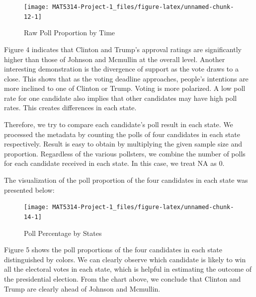 \documentclass[
  12pt,
]{article}
\begin{document}
\begin{minipage}[t]{0.7\textwidth}
\begin{figure}
\texttt{[image: MAT5314-Project-1\_files/figure-latex/unnamed-chunk-12-1]} \caption{Raw Poll Proportion by Time}\label{fig:unnamed-chunk-12}
\end{figure}
\end{minipage}
\begin{minipage}[t]{0.3\textwidth}
\vspace{0pt}
Figure 4 indicates that Clinton and Trump’s approval ratings are significantly higher than those of Johnson and Mcmullin at the overall level. Another interesting demonstration is the divergence of support as the vote draws to a close. This shows that as the voting deadline approaches, people's intentions are more inclined to one of Clinton or Trump. Voting is more polarized. A low poll rate for one candidate also implies that other candidates may have high poll rates. This creates differences in each state.
\end{minipage}

Therefore, we try to compare each candidate's poll result in each state.
We processed the metadata by counting the polls of four candidates in
each state respectively. Result is easy to obtain by multiplying the
given sample size and proportion. Regardless of the various pollsters,
we combine the number of polls for each candidate received in each
state. In this case, we treat NA as 0.

The visualization of the poll proportion of the four candidates in each
state was presented below:

\begin{minipage}[t]{0.7\textwidth}
\begin{figure}
\texttt{[image: MAT5314-Project-1\_files/figure-latex/unnamed-chunk-14-1]} \caption{Poll Percentage by States}\label{fig:unnamed-chunk-14}
\end{figure}
\end{minipage}
\begin{minipage}[t]{0.3\textwidth}
\vspace{0pt}
Figure 5 shows the poll proportions of the four candidates in each state distinguished by colors. We can clearly observe which candidate is likely to win all the electoral votes in each state, which is helpful in estimating the outcome of the presidential election. From the chart above, we conclude that Clinton and Trump are clearly ahead of Johnson and Mcmullin. 
\end{minipage}
\end{document}
